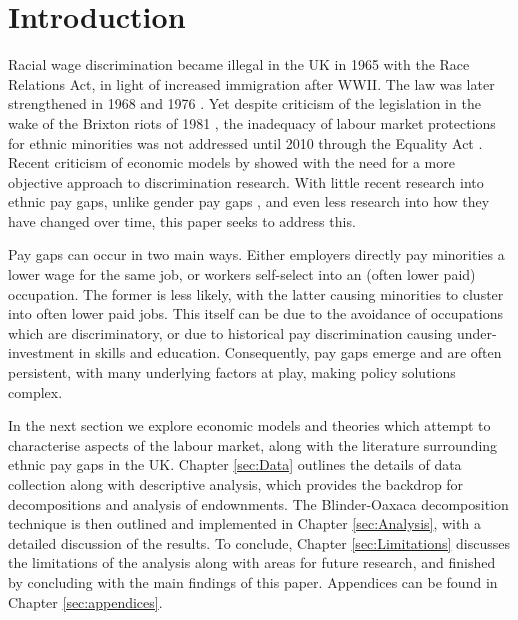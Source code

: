 \documentclass[class=article, crop=false]{standalone}
\begin{document}
\section{Introduction}
\label{sec:introduction}
Racial wage discrimination became illegal in the UK in 1965 \citep{GOV} with the Race Relations Act, in light of increased immigration after WWII. The law was later strengthened in 1968 and 1976 \citep{Sooben}. Yet despite criticism of the legislation in the wake of the Brixton riots of 1981 \citep{Solomos}, the inadequacy of labour market protections for ethnic minorities was not addressed until 2010 through the Equality Act \citep{Brown}. Recent criticism of economic models by \citet{Spriggs} showed with the need for a more objective approach to discrimination research. With little recent research into ethnic pay gaps, unlike gender pay gaps \citep{Metcalf}, and even less research into how they have changed over time, this paper seeks to address this.

Pay gaps can occur in two main ways. Either employers directly pay minorities a lower wage for the same job, or workers self-select into an (often lower paid) occupation. The former is less likely, with the latter causing minorities to cluster into often lower paid jobs. This itself can be due to the avoidance of occupations which are discriminatory, or due to historical pay discrimination causing under-investment in skills and education. Consequently, pay gaps emerge and are often persistent, with many underlying factors at play, making policy solutions complex.

In the next section we explore economic models and theories which attempt to characterise aspects of the labour market, along with the literature surrounding ethnic pay gaps in the UK. Chapter \ref{sec:Data} outlines the details of data collection along with descriptive analysis, which provides the backdrop for decompositions and analysis of endownments. The Blinder-Oaxaca decomposition technique is then outlined and implemented in Chapter \ref{sec:Analysis}, with a detailed discussion of the results. To conclude, Chapter \ref{sec:Limitations} discusses the limitations of the analysis along with areas for future research, and finished by concluding with the main findings of this paper. Appendices can be found in Chapter \ref{sec:appendices}.

\begin{comment}
Amanda's meeting notes:
Change for occup and not industry. 
Similar for industry

Possibly higher status jobs are less racist. But probs not. 

Racist attitudes cause barriers to entry. Or like a tax on employment in a certain activity so pushed away.

Link with models of the Labour Market fit in with the results. 

Stratification researchers get annoyed when we model racism. If racism is structural then there's a lot of endogeniety. 
\end{comment}

\ifstandalone

\fi
\end{document}

